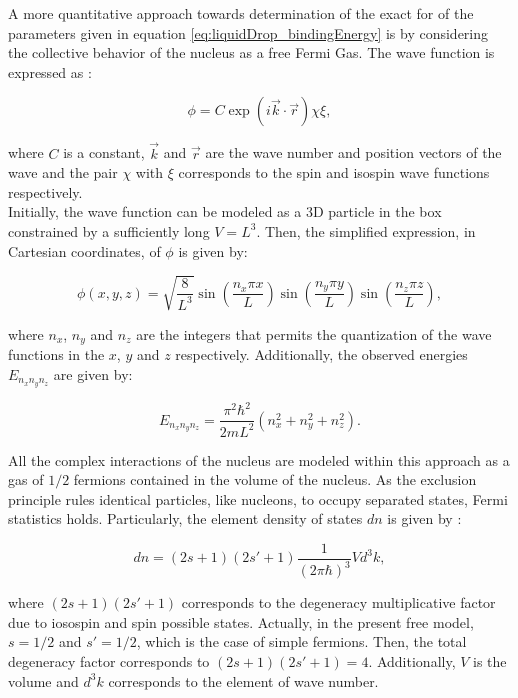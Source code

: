 \documentclass[openany]{book}
\begin{document}
A more quantitative approach towards determination of the exact for of the parameters given in equation \ref{eq:liquidDrop_bindingEnergy} is by considering the collective behavior of the nucleus as a free Fermi Gas. The wave function is expressed as \cite{bohr_mottelson_1998}: 

\begin{equation}\label{eq:liquidDrop_FermiGas}
	\phi = C \exp (i \vec k \cdot \vec r) \chi \xi, 
\end{equation}

where $C$ is a constant, $\vec k$ and $\vec r$ are the wave number and position vectors of the wave and the pair $\chi$ with $ \xi$ corresponds to the spin and isospin wave functions respectively. \\

Initially, the wave function can be modeled as a 3D particle in the box constrained by a sufficiently long $V = L^3$. Then, the simplified expression, in Cartesian coordinates, of $\phi$ is given by:

\begin{equation}\label{eq:liquidDrop_FermiGas_wavefunction}
	\phi(x, y, z) = \sqrt{\frac{8}{L^3}} \sin \left( \frac{n_x \pi x }{L}\right)  \sin \left( \frac{n_y \pi y }{L}\right)  \sin \left( \frac{n_z \pi z }{L}\right),
\end{equation}

where $n_x$, $n_y$ and $n_z$ are the integers that permits the quantization of the wave functions in the $x$, $y$ and $z$ respectively. Additionally, the observed energies $E_{n_xn_yn_z}$ are given by: 

\begin{equation}\label{eq:liquidDrop_FermiGas_energies}
	E_{n_xn_yn_z} = \frac{\pi^2 \hbar^2 }{2mL^2} (n^2_x + n^2_y + n^2_z).
\end{equation}

All the complex interactions of the nucleus are modeled within this approach as a gas of $1/2$ fermions contained in the volume of the nucleus. As the exclusion principle rules identical particles, like nucleons, to occupy separated states, Fermi statistics holds. Particularly, the element density of states $dn$  is given by \cite{bohr_mottelson_1998}: 


\begin{equation}\label{eq:liquidDrop_FermiGas_density}
	dn = (2s + 1)(2s' + 1) \frac{1}{(2\pi \hbar)^3} V d^3k,
\end{equation}

where $(2s + 1)(2s' +1)$ corresponds to the degeneracy multiplicative factor due to iosospin and spin possible states. Actually, in the present free model, $s = 1/2$ and $s' = 1/2$, which is the case of simple fermions. Then, the total degeneracy factor corresponds to $(2s + 1)(2s' + 1) = 4$. Additionally, $V$ is the volume and  $ d^3k$ corresponds to the element of wave number. \\
 
\end{document}
